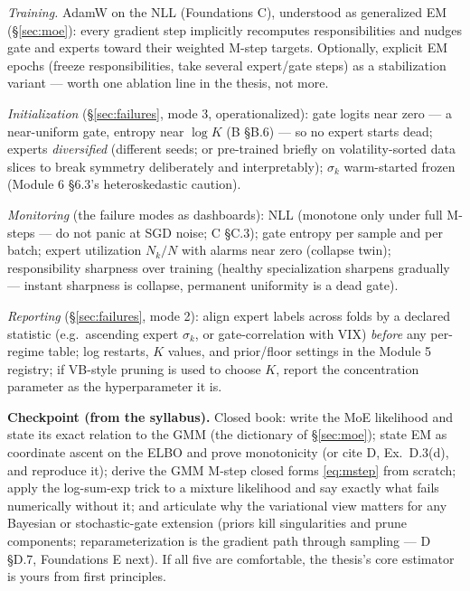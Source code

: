 \documentclass[11pt]{article}
\numberwithin{equation}{section}
\theoremstyle{plain}
\theoremstyle{definition}
\theoremstyle{remark}
\begin{document}
\emph{Training.} AdamW on the NLL (Foundations C), understood as generalized EM (\S\ref{sec:moe}): every gradient step implicitly recomputes responsibilities and nudges gate and experts toward their weighted M-step targets. Optionally, explicit EM epochs (freeze responsibilities, take several expert/gate steps) as a stabilization variant --- worth one ablation line in the thesis, not more.

\emph{Initialization} (\S\ref{sec:failures}, mode 3, operationalized): gate logits near zero --- a near-uniform gate, entropy near $\log K$ (B \S B.6) --- so no expert starts dead; experts \emph{diversified} (different seeds; or pre-trained briefly on volatility-sorted data slices to break symmetry deliberately and interpretably); $\sigma_k$ warm-started frozen (Module 6 \S6.3's heteroskedastic caution).

\emph{Monitoring} (the failure modes as dashboards): NLL (monotone only under full M-steps --- do not panic at SGD noise; C \S C.3); gate entropy per sample and per batch; expert utilization $N_k/N$ with alarms near zero (collapse twin); responsibility sharpness over training (healthy specialization sharpens gradually --- instant sharpness is collapse, permanent uniformity is a dead gate).

\emph{Reporting} (\S\ref{sec:failures}, mode 2): align expert labels across folds by a declared statistic (e.g.\ ascending expert $\sigma_k$, or gate-correlation with VIX) \emph{before} any per-regime table; log restarts, $K$ values, and prior/floor settings in the Module 5 registry; if VB-style pruning is used to choose $K$, report the concentration parameter as the hyperparameter it is.

\medskip
\noindent\textbf{Checkpoint (from the syllabus).} Closed book: write the MoE likelihood and state its exact relation to the GMM (the dictionary of \S\ref{sec:moe}); state EM as coordinate ascent on the ELBO and prove monotonicity (or cite D, Ex.\ D.3(d), and reproduce it); derive the GMM M-step closed forms \eqref{eq:mstep} from scratch; apply the log-sum-exp trick to a mixture likelihood and say exactly what fails numerically without it; and articulate why the variational view matters for any Bayesian or stochastic-gate extension (priors kill singularities and prune components; reparameterization is the gradient path through sampling --- D \S D.7, Foundations E next). If all five are comfortable, the thesis's core estimator is yours from first principles.

\end{document}
